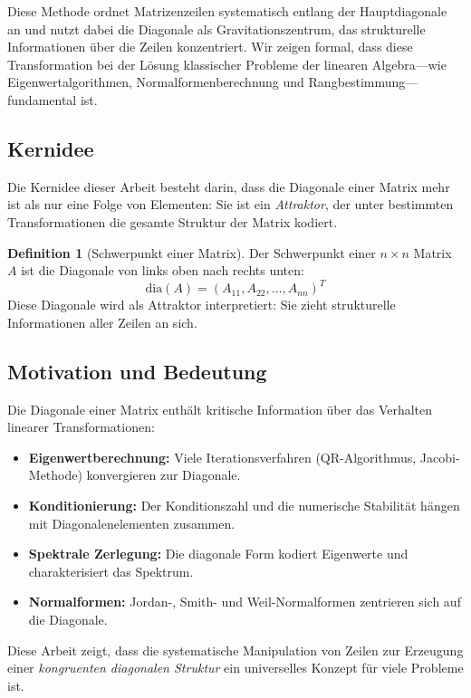 \documentclass[a4paper,12pt]{article}
\theoremstyle{definition}
\newtheorem{definition}{Definition}
\begin{document}
Diese Methode ordnet Matrizenzeilen systematisch entlang der Hauptdiagonale an und nutzt dabei die Diagonale als Gravitationszentrum, das strukturelle Informationen über die Zeilen konzentriert. Wir zeigen formal, dass diese Transformation bei der Lösung klassischer Probleme der linearen Algebra—wie Eigenwertalgorithmen, Normalformenberechnung und Rangbestimmung—fundamental ist.

\subsection{Kernidee}

Die Kernidee dieser Arbeit besteht darin, dass die Diagonale einer Matrix mehr ist als nur eine Folge von Elementen: Sie ist ein \emph{Attraktor}, der unter bestimmten Transformationen die gesamte Struktur der Matrix kodiert.

\begin{definition}[Schwerpunkt einer Matrix]
	Der Schwerpunkt einer $n \times n$ Matrix $A$ ist die Diagonale von links oben nach rechts unten:
	\[
	\text{dia}(A) = (A_{11}, A_{22}, \ldots, A_{nn})^T
	\]
	Diese Diagonale wird als Attraktor interpretiert: Sie zieht strukturelle Informationen aller Zeilen an sich.
\end{definition}

\subsection{Motivation und Bedeutung}

Die Diagonale einer Matrix enthält kritische Information über das Verhalten linearer Transformationen:
\begin{itemize}
	\item \textbf{Eigenwertberechnung:} Viele Iterationsverfahren (QR-Algorithmus, Jacobi-Methode) konvergieren zur Diagonale.
	\item \textbf{Konditionierung:} Der Konditionszahl und die numerische Stabilität hängen mit Diagonalenelementen zusammen.
	\item \textbf{Spektrale Zerlegung:} Die diagonale Form kodiert Eigenwerte und charakterisiert das Spektrum.
	\item \textbf{Normalformen:} Jordan-, Smith- und Weil-Normalformen zentrieren sich auf die Diagonale.
\end{itemize}

Diese Arbeit zeigt, dass die systematische Manipulation von Zeilen zur Erzeugung einer \emph{kongruenten diagonalen Struktur} ein universelles Konzept für viele Probleme ist.
\end{document}

